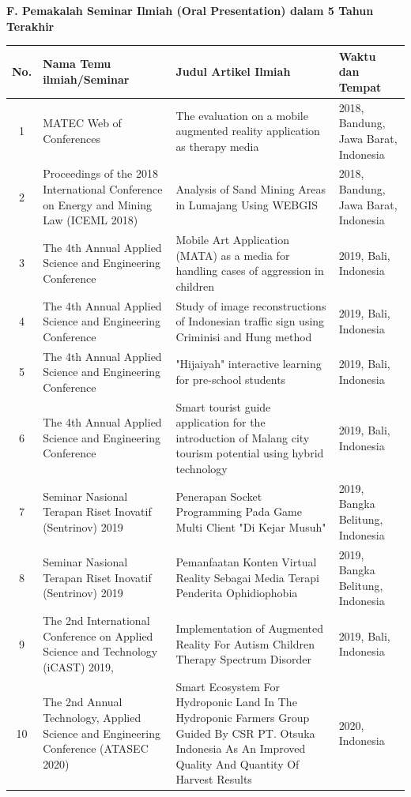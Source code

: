 \textbf{F. Pemakalah Seminar Ilmiah (Oral Presentation) dalam 5 Tahun Terakhir}

{\footnotesize
\begin{longtable}{|c|p{5cm}|p{5.5cm}|p{3.5cm}|}
\hline
\textbf{No.} & \textbf{Nama Temu ilmiah/Seminar} & \textbf{Judul Artikel Ilmiah} & \textbf{Waktu dan Tempat} \\
\hline
1 & MATEC Web of Conferences & The evaluation on a mobile augmented reality application as therapy media & 2018, Bandung, Jawa Barat, Indonesia \\
\hline
2 & Proceedings of the 2018 International Conference on Energy and Mining Law (ICEML 2018) & Analysis of Sand Mining Areas in Lumajang Using WEBGIS & 2018, Bandung, Jawa Barat, Indonesia \\
\hline
3 & The 4th Annual Applied Science and Engineering Conference & Mobile Art Application (MATA) as a media for handling cases of aggression in children & 2019, Bali, Indonesia \\
\hline
4 & The 4th Annual Applied Science and Engineering Conference & Study of image reconstructions of Indonesian traffic sign using Criminisi and Hung method & 2019, Bali, Indonesia \\
\hline
5 & The 4th Annual Applied Science and Engineering Conference & "Hijaiyah" interactive learning for pre-school students & 2019, Bali, Indonesia \\
\hline
6 & The 4th Annual Applied Science and Engineering Conference & Smart tourist guide application for the introduction of Malang city tourism potential using hybrid technology & 2019, Bali, Indonesia \\
\hline
7 & Seminar Nasional Terapan Riset Inovatif (Sentrinov) 2019 & Penerapan Socket Programming Pada Game Multi Client "Di Kejar Musuh" & 2019, Bangka Belitung, Indonesia \\
\hline
8 & Seminar Nasional Terapan Riset Inovatif (Sentrinov) 2019 & Pemanfaatan Konten Virtual Reality Sebagai Media Terapi Penderita Ophidiophobia & 2019, Bangka Belitung, Indonesia \\
\hline
9 & The 2nd International Conference on Applied Science and Technology (iCAST) 2019, & Implementation of Augmented Reality For Autism Children Therapy Spectrum Disorder & 2019, Bali, Indonesia \\
\hline
10 & The 2nd Annual Technology, Applied Science and Engineering Conference (ATASEC 2020) & Smart Ecosystem For Hydroponic Land In The Hydroponic Farmers Group Guided By CSR PT. Otsuka Indonesia As An Improved Quality And Quantity Of Harvest Results & 2020, Indonesia \\

\end{longtable}}
